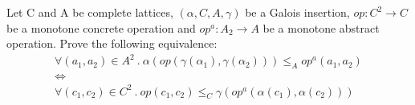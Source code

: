 {Let C and A be complete lattices, $(\alpha, C, A, \gamma)$ be a Galois insertion, $op : C^2 \to C$ be a monotone concrete operation and $op^a : A_2 \to A$ be a monotone abstract operation. Prove the following equivalence:
$$
\begin{array}{c}
	\forall (a_1, a_2) \in A^2\ .\ \alpha(op(\gamma(\alpha_1), \gamma(\alpha_2))) \leq_A op^a(a_1,a_2) \\
	\iff \\
	\forall (c_1, c_2) \in C^2\ .\ op(c_1, c_2) \leq_C \gamma(op^a(\alpha(c_1), \alpha(c_2)))
\end{array}
$$
}
{}